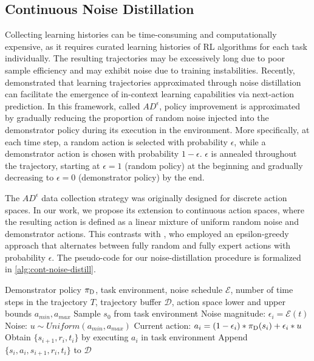 \documentclass{article}
\theoremstyle{plain}
\theoremstyle{definition}
\theoremstyle{remark}
\begin{document}
\subsection{Continuous Noise Distillation}
\label{subsec:cnd}

Collecting learning histories can be time-consuming and computationally expensive, as it requires curated learning histories of RL algorithms for each task individually. The resulting trajectories may be excessively long due to poor sample efficiency and may exhibit noise due to training instabilities. Recently, \citet{zisman2024emergenceincontextreinforcementlearning} demonstrated that learning trajectories approximated through noise distillation can facilitate the emergence of in-context learning capabilities via next-action prediction. In this framework, called $AD^\epsilon$, policy improvement is approximated by gradually reducing the proportion of random noise injected into the demonstrator policy during its execution in the environment. More specifically, at each time step, a random action is selected with probability 
$\epsilon$, while a demonstrator action is chosen with probability $1-\epsilon$. $\epsilon$ is annealed throughout the trajectory, starting at 
$\epsilon = 1$ (random policy) at the beginning and gradually decreasing to 
$\epsilon = 0$ (demonstrator policy) by the end.

The $AD^\epsilon$ data collection strategy was originally designed for discrete action spaces. In our work, we propose its extension to continuous action spaces, where the resulting action is defined as a linear mixture of uniform random noise and demonstrator actions. This contrasts with \citet{brown2019betterthandemonstratorimitationlearningautomaticallyranked}, who employed an epsilon-greedy approach that alternates between fully random and fully expert actions with probability $\epsilon$. The pseudo-code for our noise-distillation procedure is formalized in \cref{alg:cont-noise-distill}.

 \begin{algorithm}[] %
 \caption{Noise distillation for continuous action spaces} %
 \label{alg:cont-noise-distill} %
 \begin{algorithmic}[1] %
     \REQUIRE Demonstrator policy $\pi_{\rm D}$, task environment, noise schedule $\mathcal{E}$, number of time steps in the trajectory $T$, trajectory buffer $\mathcal{D}$, action space lower and upper bounds $a_{min}, a_{max}$
     \STATE Sample $s_0$ from task environment
            \STATE Noise magnitude: $\epsilon_i = \mathcal{E}(t)$
            \STATE Noise: $u \sim Uniform(a_{min}, a_{max})$
 		\STATE Current action: $a_i = (1-\epsilon_i)*\pi_{\rm D}(s_i) + \epsilon_i
        * u$ 
            \STATE Obtain $\{s_{i+1}, r_{i}, t_i\}$ by executing $a_i$ in task environment
            \STATE Append $\{s_i, a_i, s_{i+1}, r_{i}, t_i\}$ to $\mathcal{D}$
 	\ENDFOR
 \end{algorithmic}
 \end{algorithm}
\end{document}
